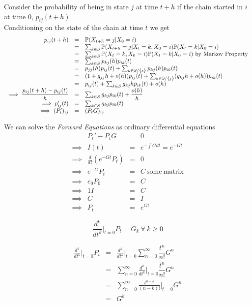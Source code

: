 \documentclass[11pt,a4paper]{article}
\begin{document}
Consider the probability of being in state $j$ at time $t+h$ if the chain started in $i$ at time $0$, $p_{ij}(t+h)$.\\
Conditioning on the state of the chain at time $t$ we get
\[\begin{array}{rcl}
p_{ij}(t+h)&=&\prob(X_{t+h}=j|X_0=i)\\
&=&\sum_{k\in S}\prob(X_{t+h}=j|X_t=k,X_0=i)\prob(X_t=k|X_0=i)\\
&=&\sum_{k\in S}\prob(X_t=k,X_0=i)\prob(X_t=k|X_0=i)\mathrm{\ by\ Markov\ Property}\\
&=&\sum_{k\in S}p_{kj}(h)p_{ik}(t)\\
&=&p_{jj}(h)p_{ij}(t)+\sum_{k\in S/\{s\}}p_{kj}(h)p_{ik}(t)\\
&=&(1+g_{jj}h+o(h))p_{ij}(t)+\sum_{k\in S/\{j\}}(g_{kj}h+o(h))p_{ik}(t)\\
&=&p_{ij}(t)+\sum_{k\in S}g_{kj}hp_{ik}(t)+o(h)\\
\implies\dfrac{p_{ij}(t+h)-p_{ij}(t)}{h}&=&\sum_{k\in S}g_{kj}p_{ik}(t)+\dfrac{o(h)}{h}\\
\implies p_{ij}'(t)&=&\sum_{k\in S}g_{kj}p_{ik}(t)\\
\implies (P_t')_{ij}&=&(P_tG)_{ij}
\end{array}\]

We can solve the \textit{Forward Equations} as ordinary differential equations
\[\begin{array}{rrcl}
&P_t'-P_tG&=&0\\
\implies&I(t)&=&e^{-\int Gdt}=e^{-Gt}\\
\implies&\frac{d}{dt}(e^{-Gt}P_t)&=&0\\
\implies&e^{-G}P_t&=&C\mathrm{\ some\ matrix}\\
\implies&e_0P_0&=&C\\
\implies&1I&=&C\\
\implies&C&=&I\\
\implies&P_t&=&e^{Gt}
\end{array}\]

\theorem{}
$$\frac{d^k}{dt^k}\bigg|_{t=0}P_t=G_k\ \forall\ k\geq 0$$

\[\begin{array}{rcl}
\frac{d^k}{dt^k}\bigg|_{t=0}P_t&=&\frac{d^k}{dt^k}\bigg|_{t=0}\sum\limits_{n=0}^\infty\dfrac{t^n}{n!}G^n\\
&=&\sum\limits_{n=0}^\infty\frac{d^k}{dt^k}\bigg|_{t=0}\dfrac{t^n}{n!}G^n\\
&=&\sum\limits_{n=0}^\infty\frac{t^{n-k}}{(n-k)!}\bigg|_{t=0}G^n\\
&=&G^k
\end{array}\]
\end{document}

